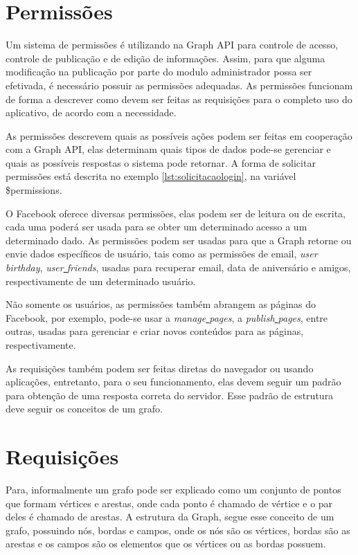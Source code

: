 \section{Permissões}
Um sistema de permissões é utilizando na Graph API para controle de acesso, controle de publicação e de edição de informações. Assim, para que alguma modificação na publicação por parte do modulo administrador possa ser efetivada, é necessário possuir as permissões adequadas. As permissões funcionam de forma a descrever como devem ser feitas as requisições para o completo uso do aplicativo, de acordo com a necessidade.

As permissões descrevem quais as possíveis ações podem ser feitas em cooperação com a Graph API, elas determinam quais tipos de dados pode-se gerenciar e quais as possíveis respostas o sistema pode retornar. A forma de solicitar permissões está descrita no exemplo \ref{lst:solicitacaologin}, na variável \$permissions.

O Facebook oferece diversas permissões, elas podem ser de leitura ou de escrita, cada uma poderá ser usada para se obter um determinado acesso a um determinado dado. As permissões podem ser usadas para que a Graph retorne ou envie dados específicos de usuário, tais como as permissões de email, \textit{user\underline{{ }}birthday}, \textit{user\underline{{ }}friends}, usadas para recuperar email, data de aniversário e amigos, respectivamente de um determinado usuário.

Não somente os usuários, as permissões também abrangem as páginas do Facebook, por exemplo, pode-se usar a \textit{manage\underline{{ }}pages}, a \textit{publish\underline{{ }}pages}, entre outras, usadas para gerenciar e criar novos conteúdos para as páginas, respectivamente.

As requisições também podem ser feitas diretas do navegador ou usando aplicações, entretanto, para o seu funcionamento, elas devem seguir um padrão para obtenção de uma resposta correta do servidor. Esse padrão de estrutura deve seguir os conceitos de um grafo.

\section{Requisições}

Para\cite{soares2014}, informalmente um grafo pode ser explicado como um conjunto de pontos que formam vértices e arestas, onde cada ponto é chamado de vértice e o par deles é chamado de arestas. A estrutura da Graph, segue esse conceito de um grafo, possuindo nós, bordas e campos, onde os nós são os vértices, bordas são as arestas e os campos são os elementos que os vértices ou as bordas possuem.

